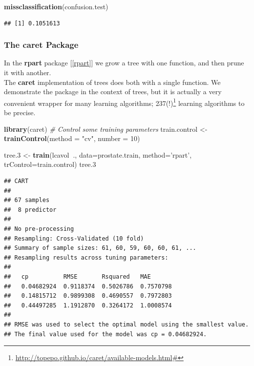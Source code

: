\documentclass[]{book}
\newenvironment{Shaded}{\begin{snugshade}}{\end{snugshade}}
\newcommand{\CommentTok}[1]{\textcolor[rgb]{0.56,0.35,0.01}{\textit{#1}}}
\newcommand{\DataTypeTok}[1]{\textcolor[rgb]{0.13,0.29,0.53}{#1}}
\newcommand{\DecValTok}[1]{\textcolor[rgb]{0.00,0.00,0.81}{#1}}
\newcommand{\FloatTok}[1]{\textcolor[rgb]{0.00,0.00,0.81}{#1}}
\newcommand{\KeywordTok}[1]{\textcolor[rgb]{0.13,0.29,0.53}{\textbf{#1}}}
\newcommand{\NormalTok}[1]{#1}
\newcommand{\OperatorTok}[1]{\textcolor[rgb]{0.81,0.36,0.00}{\textbf{#1}}}
\newcommand{\StringTok}[1]{\textcolor[rgb]{0.31,0.60,0.02}{#1}}
\renewcommand{\href}[2]{#2\footnote{\url{#1}}}
\theoremstyle{definition}
\theoremstyle{definition}
\theoremstyle{definition}
\theoremstyle{remark}
\begin{document}
\begin{Shaded}
\begin{Highlighting}[]
\KeywordTok{missclassification}\NormalTok{(confusion.test)}
\end{Highlighting}
\end{Shaded}

\begin{verbatim}
## [1] 0.1051613
\end{verbatim}

\hypertarget{caret}{%
\subsubsection{The caret Package}\label{caret}}

In the \textbf{rpart} package {[}\ref{rpart}{]} we grow a tree with one function, and then prune it with another.\\
The \textbf{caret} implementation of trees does both with a single function.
We demonstrate the package in the context of trees, but it is actually a very convenient wrapper for many learning algorithms; \href{http://topepo.github.io/caret/available-models.html\#}{237(!)}
learning algorithms to be precise.

\begin{Shaded}
\begin{Highlighting}[]
\KeywordTok{library}\NormalTok{(caret)}
\CommentTok{# Control some training parameters}
\NormalTok{train.control <-}\StringTok{ }\KeywordTok{trainControl}\NormalTok{(}\DataTypeTok{method =} \StringTok{"cv"}\NormalTok{,}
                           \DataTypeTok{number =} \DecValTok{10}\NormalTok{)}

\NormalTok{tree}\FloatTok{.3}\NormalTok{ <-}\StringTok{ }\KeywordTok{train}\NormalTok{(lcavol}\OperatorTok{~}\NormalTok{., }\DataTypeTok{data=}\NormalTok{prostate.train, }
                \DataTypeTok{method=}\StringTok{'rpart'}\NormalTok{, }
                \DataTypeTok{trControl=}\NormalTok{train.control)}
\NormalTok{tree}\FloatTok{.3}
\end{Highlighting}
\end{Shaded}

\begin{verbatim}
## CART 
## 
## 67 samples
##  8 predictor
## 
## No pre-processing
## Resampling: Cross-Validated (10 fold) 
## Summary of sample sizes: 61, 60, 59, 60, 60, 61, ... 
## Resampling results across tuning parameters:
## 
##   cp          RMSE       Rsquared   MAE      
##   0.04682924  0.9118374  0.5026786  0.7570798
##   0.14815712  0.9899308  0.4690557  0.7972803
##   0.44497285  1.1912870  0.3264172  1.0008574
## 
## RMSE was used to select the optimal model using the smallest value.
## The final value used for the model was cp = 0.04682924.
\end{verbatim}
\end{document}
